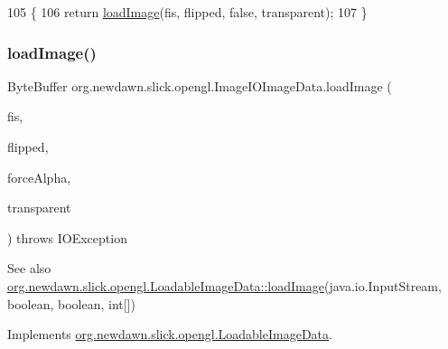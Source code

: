 \begin{DoxyCode}
105                                                                                                         \{
106         \textcolor{keywordflow}{return} \mbox{\hyperlink{classorg_1_1newdawn_1_1slick_1_1opengl_1_1_image_i_o_image_data_aa524a7c6717557a6ac60d1ac8b413950}{loadImage}}(fis, flipped, \textcolor{keyword}{false}, transparent);
107     \}
\end{DoxyCode}
\mbox{\label{classorg_1_1newdawn_1_1slick_1_1opengl_1_1_image_i_o_image_data_acd7d95d98f777ed7abff40dcb07d9d01}} 
\subsubsection{\texorpdfstring{load\+Image()}{loadImage()}\hspace{0.1cm}{\footnotesize\ttfamily [3/3]}}
{\footnotesize\ttfamily Byte\+Buffer org.\+newdawn.\+slick.\+opengl.\+Image\+I\+O\+Image\+Data.\+load\+Image (\begin{DoxyParamCaption}\item[{Input\+Stream}]{fis,  }\item[{boolean}]{flipped,  }\item[{boolean}]{force\+Alpha,  }\item[{int \mbox{[}$\,$\mbox{]}}]{transparent }\end{DoxyParamCaption}) throws I\+O\+Exception\hspace{0.3cm}{\ttfamily [inline]}}

\begin{DoxySeeAlso}{See also}
\mbox{\hyperlink{interfaceorg_1_1newdawn_1_1slick_1_1opengl_1_1_loadable_image_data_a640021b955dde7deeeeabb5ac3738d2b}{org.\+newdawn.\+slick.\+opengl.\+Loadable\+Image\+Data\+::load\+Image}}(java.\+io.\+Input\+Stream, boolean, boolean, int\mbox{[}\mbox{]}) 
\end{DoxySeeAlso}


Implements \mbox{\hyperlink{interfaceorg_1_1newdawn_1_1slick_1_1opengl_1_1_loadable_image_data_ae1be205b86c674550235e9f357adadf5}{org.\+newdawn.\+slick.\+opengl.\+Loadable\+Image\+Data}}.



